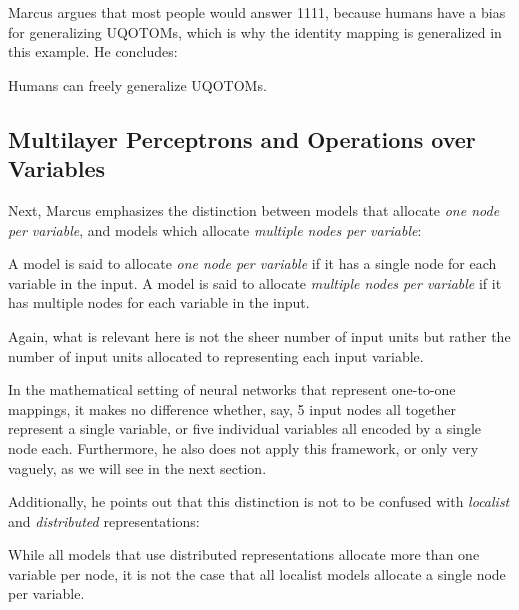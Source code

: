 \documentclass[../../main.tex]{subfiles}
\begin{document}
Marcus argues that most people would answer 1111, because humans have a bias for generalizing UQOTOMs, which is why the identity mapping is generalized in this example. He concludes:

\begin{premise}
    Humans can freely generalize UQOTOMs.
\end{premise}


\subsection{Multilayer Perceptrons and Operations over Variables}
Next, Marcus emphasizes the distinction between models that allocate \emph{one node per variable}, and models which allocate \emph{multiple nodes per variable}:

\begin{definition}
    A model is said to allocate \emph{one node per variable} if it has a single node for each variable in the input. A model is said to allocate \emph{multiple nodes per variable} if it has multiple nodes for each variable in the input.
\end{definition}

\begin{citecallout}
    Again, what is relevant here is not the sheer number of input units
    but rather the number of input units allocated to representing each input
    variable.
\end{citecallout}

\begin{critique}
    In the mathematical setting of neural networks that represent one-to-one mappings, it makes no difference whether, say, 5 input nodes all together represent a single variable, or five individual variables all encoded by a single node each. Furthermore, he also does not apply this framework, or only very vaguely, as we will see in the next section.
\end{critique}

Additionally, he points out that this distinction is not to be confused with \emph{localist} and \emph{distributed} representations:

\begin{citecallout}
    While all models that use distributed representations allocate more than one variable per node, it is
    not the case that all localist models allocate a single node per variable.
\end{citecallout}
\end{document}
